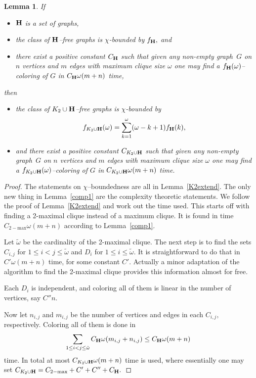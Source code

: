\documentclass{article}
\theoremstyle{plain}
\newtheorem{lem}[thm]{Lemma}
\theoremstyle{definition}
\begin{document}
\begin{lem}
If 
\begin{itemize}
\item[-] ${\bf H}$ is a set of graphs,
\item[-]  the class of ${\bf H}$--free graphs is  $\chi$-bounded by $f_{\bf H},$ and
\item[-]  there exist a positive constant $C_{\bf H}$ such that given any non-empty graph~$G$ on $n$ vertices and $m$ edges with maximum clique size $\omega$ one may find a
$f_{\bf H}(\omega)$--coloring of $G$ in $C_{\bf H}\omega(m+n)$ time,
\end{itemize}
then
\begin{itemize}
\item[-] the class of  $K_2 \cup {\bf H  } $--free graphs is $\chi$-bounded by
\[
f_{K_2 \cup {\bf H  } }(\omega) = \sum_{k=1}^{\omega}  (\omega-k+1)  f_{{\bf H  } }(k),
\]
\item[-] and there exist a positive constant $C_{K_2 \cup {\bf H  } }$ such that given any non-empty graph~$G$ on $n$ vertices and $m$ edges with maximum clique size $\omega$ one may find a
$f_{K_2 \cup {\bf H  } }(\omega)$--coloring of $G$ in $C_{K_2 \cup {\bf H  } }\omega(m+n)$ time.
\end{itemize}
\end{lem}
\begin{proof}
The statements on $\chi$--boundedness are all in Lemma~\ref{K2extend}. The only new thing in Lemma~\ref{comp1} are the complexity theoretic statements. We follow the proof of Lemma~\ref{K2extend} and work out the time used. This starts off with finding a 2-maximal clique instead of a maximum clique. It is found in time $C_{\mathrm{2-max}}\omega(m+n)$ according to Lemma~\ref{comp1}.

Let $\tilde\omega$ be the cardinality of the 2-maximal clique. The next step is to find the sets $C_{i,j}$ for $1\leq i < j \leq \tilde\omega$ and $D_i$ for $1\leq i \leq \tilde\omega.$ It is straightforward to do that in $C'\omega(m+n)$ time, for some constant $C'.$ Actually a minor adaptation of the algorithm to find the 2-maximal clique provides this information almost for free.

Each $D_i$ is independent, and coloring all of them is linear in the number of vertices, say $C''n.$

Now let $n_{i,j}$ and $m_{i,j}$ be the number of vertices and edges in each $C_{i,j},$ respectively. Coloring all of them is done in
\[
\sum_{1\leq i < j \leq \tilde\omega}  C_{\bf H}\omega(m_{i,j}+n_{i,j}) \leq C_{\bf H}\omega(m+n)
\]
time. In total at most $C_{K_2 \cup {\bf H  } }\omega(m+n)$ time is used, where essentially one may set $C_{K_2 \cup {\bf H  } } = C_{\mathrm{2-max}} + C' + C'' + C_{\bf H}.$
\end{proof}
\end{document}
